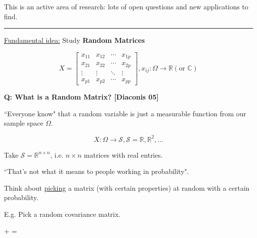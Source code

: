 \documentclass[twoside]{article}
\begin{document}
This is an active area of research: lots of open questions and new applications to find.\\

\hrule

\underline{Fundamental idea:} Study \textbf{Random Matrices}

$$X=
\begin{bmatrix}
	x_{11} & x_{12} & \cdots & x_{1p}\\
	x_{21} & x_{22} & \cdots & x_{2p}\\
	\vdots &\vdots & \ddots & \vdots \\
	x_{p1} & x_{p2} &\cdots & x_{pp}
\end{bmatrix}, x_{ij}:\Omega\rightarrow\mathbb{R} (\text{or } \mathbb{C})
$$

\textbf{Q: What is a Random Matrix? [Diaconis 05]}

``Everyone know" that a random variable is just a measurable function from our sample space $\Omega$.

$$X:\Omega\rightarrow \mathcal{S}, \mathcal{S}=\mathbb{R},\mathbb{R}^2,\dots$$

Take $\mathcal{S}=\mathbb{R}^{n\times n}$, i.e. $n\times n$ matrices with real entries.

``That's not what it means to people working in probability".

Think about \underline{picking} a matrix (with certain properties) at random with a certain probability.

E.g. Pick a random covariance matrix.

 +  = \\
\end{document}
